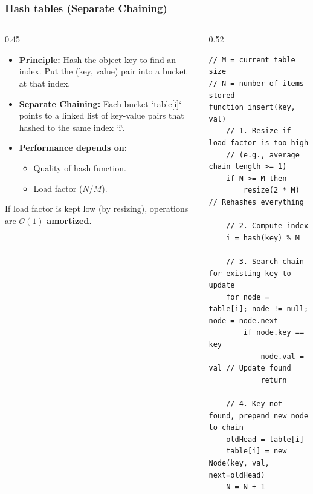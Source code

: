 \documentclass[8pt,aspectratio=169]{beamer}
\begin{document}
\begin{frame}[fragile]
\frametitle{Hash tables (Separate Chaining)}

\begin{columns}[T]
    \begin{column}{0.45\textwidth}
        \begin{itemize}
            \item \textbf{Principle:} Hash the object key to find an index. Put the (key, value) pair into a bucket at that index.
            \item \textbf{Separate Chaining:} Each bucket `table[i]` points to a linked list of key-value pairs that hashed to the same index `i`.
            \item \textbf{Performance depends on:}
            \begin{itemize}
                \item Quality of hash function.
                \item Load factor ($N/M$).
            \end{itemize}
        \end{itemize}
        \vspace{1em}
        If load factor is kept low (by resizing), operations are $\mathcal{O}(1)$ \textbf{amortized}.
    \end{column}

    \begin{column}{0.52\textwidth}
    \begin{lstlisting}[basicstyle=\tiny\ttfamily, frame=single]
// M = current table size
// N = number of items stored
function insert(key, val)
    // 1. Resize if load factor is too high
    // (e.g., average chain length >= 1)
    if N >= M then
        resize(2 * M) // Rehashes everything

    // 2. Compute index
    i = hash(key) % M

    // 3. Search chain for existing key to update
    for node = table[i]; node != null; node = node.next
        if node.key == key
            node.val = val // Update found
            return

    // 4. Key not found, prepend new node to chain
    oldHead = table[i]
    table[i] = new Node(key, val, next=oldHead)
    N = N + 1
    \end{lstlisting}
    \end{column}
\end{columns}
\end{frame}
\end{document}
